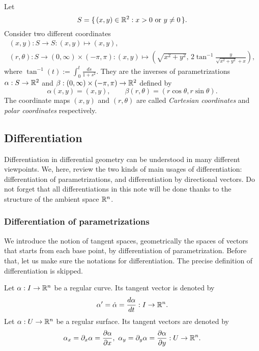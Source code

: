 \documentclass{../exp}
\def\a{\alpha}
\begin{document}
\begin{ex}
Let
\[S=\{\,(x,y)\in\mathbb{R}^2:x>0\text{ or }y\ne0\,\}.\]
Consider two different coordinates
\begin{gather*}
(x,y):S\to S:(x,y)\mapsto(x,y),\\
(r,\theta):S\to(0,\infty)\times(-\pi,\pi):(x,y)\mapsto(\sqrt{x^2+y^2},\,2\tan^{-1}\frac y{\sqrt{x^2+y^2}+x}),
\end{gather*}
where $\tan^{-1}(t):=\int_0^t\frac{ds}{1+s^2}$.
They are the inverses of parametrizations $\a:S\to\R^2$ and $\beta:(0,\infty)\times(-\pi,\pi)\to\R^2$ defined by
\[\a(x,y)=(x,y),\qquad\beta(r,\theta)=(r\cos\theta,r\sin\theta).\]
The coordinate maps $(x,y)$ and $(r,\theta)$ are called \emph{Cartesian coordinates} and \emph{polar coordinates} respectively.
\end{ex}

 


\subsection{Differentiation}
Differentiation in differential geometry can be understood in many different viewpoints.
We, here, review the two kinds of main usages of differentiation: differentiation of parametrizations, and differentiation by directional vectors.
Do not forget that all differentiations in this note will be done thanks to the structure of the ambient space $\mathbb{R}^n$.

\subsubsection{Differentiation of parametrizations}
We introduce the notion of tangent spaces, geometrically the spaces of vectors that starts from each base point, by differentiation of parametrization.
Before that, let us make sure the notations for differentiation.
The precise definition of differentiation is skipped.

\begin{notn*}
Let $\a:I\to\R^n$ be a regular curve.
Its tangent vector is denoted by
\[\a'=\dot\a=\dd{\a}{t}:I\to\R^n.\]
Let $\a:U\to\R^n$ be a regular surface.
Its tangent vectors are denoted by
\[\a_x=\pd_x\a=\pd{\a}{x},\ \a_y=\pd_y\a=\pd{\a}{y}:U\to\R^n.\]
\end{notn*}
\end{document}
